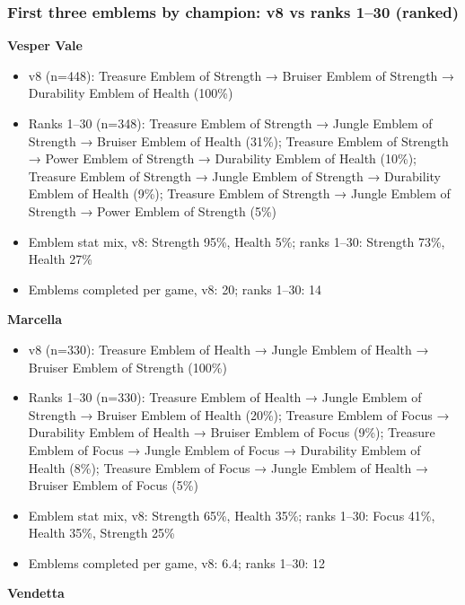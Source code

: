 \documentclass[
  10pt,
]{article}
\providecommand{\tightlist}{%
  \setlength{\itemsep}{0pt}\setlength{\parskip}{0pt}}
\begin{document}
\subsubsection{First three emblems by champion: v8 vs ranks 1--30
(ranked)}\label{first-three-emblems-by-champion-v8-vs-ranks-130-ranked}

\textbf{Vesper Vale}

\begin{itemize}
\tightlist
\item
  v8 (n=448): Treasure Emblem of Strength → Bruiser Emblem of Strength →
  Durability Emblem of Health (100\%)
\item
  Ranks 1--30 (n=348): Treasure Emblem of Strength → Jungle Emblem of
  Strength → Bruiser Emblem of Health (31\%); Treasure Emblem of
  Strength → Power Emblem of Strength → Durability Emblem of Health
  (10\%); Treasure Emblem of Strength → Jungle Emblem of Strength →
  Durability Emblem of Health (9\%); Treasure Emblem of Strength →
  Jungle Emblem of Strength → Power Emblem of Strength (5\%)
\item
  Emblem stat mix, v8: Strength 95\%, Health 5\%; ranks 1--30: Strength
  73\%, Health 27\%
\item
  Emblems completed per game, v8: 20; ranks 1--30: 14
\end{itemize}

\textbf{Marcella}

\begin{itemize}
\tightlist
\item
  v8 (n=330): Treasure Emblem of Health → Jungle Emblem of Health →
  Bruiser Emblem of Strength (100\%)
\item
  Ranks 1--30 (n=330): Treasure Emblem of Health → Jungle Emblem of
  Strength → Bruiser Emblem of Health (20\%); Treasure Emblem of Focus →
  Durability Emblem of Health → Bruiser Emblem of Focus (9\%); Treasure
  Emblem of Focus → Jungle Emblem of Focus → Durability Emblem of Health
  (8\%); Treasure Emblem of Focus → Jungle Emblem of Health → Bruiser
  Emblem of Focus (5\%)
\item
  Emblem stat mix, v8: Strength 65\%, Health 35\%; ranks 1--30: Focus
  41\%, Health 35\%, Strength 25\%
\item
  Emblems completed per game, v8: 6.4; ranks 1--30: 12
\end{itemize}

\textbf{Vendetta}
\end{document}
